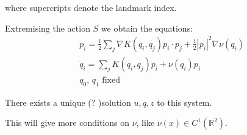 \documentclass[runningheads]{llncs}
\newcommand{\RdM}{\mathbb{R}^{d\times M}}
\begin{document}
where supercripts denote the landmark index. 

Extremising the action $S$ we obtain the equations: 
\begin{align}\label{pq:optimality}
& \dot p_i =\frac12 \sum_j \nabla K(q_i,q_j)p_i\cdot p_j  + \frac12 |p_i|^2
\nabla \nu(q_i)\\
& \dot q_i = \sum_j K(q_i,q_j)p_i + \nu(q_i)p_i\\
& q_0,\,q_1\text{ fixed}
\end{align}

\begin{theorem}
There exists a unique (? )solution $u, q, z$ to this system.

This will give more conditions on $\nu$, like $\nu(x) \in C^{1}(\mathbb R^2)$. 
\end{theorem}



\end{document}
